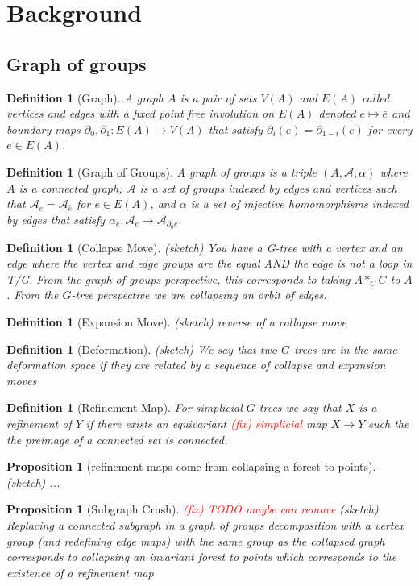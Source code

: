 \documentclass{article}
\newcommand{\fix}[1]{\textcolor{red}{(fix) #1}}
\theoremstyle{mystyle}
\newtheorem{pro}[thm]{Proposition}
\newtheorem{defn}[thm]{Definition}
\theoremstyle{remark}
\begin{document}
\tableofcontents

\section{Background}
\subsection{Graph of groups}
\begin{defn}
    [Graph]
    A graph $A$ is a pair of sets $V(A)$ and $E(A)$ called vertices and edges with a fixed point free involution on $E(A)$ denoted $e\mapsto \bar{e}$ and boundary maps $\partial_0,\partial_1: E(A)\to V(A)$ that satisfy $\partial_{i}(\bar{e})=\partial_{1-i}(e)$ for every $e \in E(A)$.
\end{defn}
\begin{defn}
    [Graph of Groups]
    A graph of groups is a triple $(A,\mathscr A, \alpha)$ where $A$ is a connected graph, $\mathscr A$ is a set of groups indexed by edges and vertices such that $\mathscr A_e=\mathscr A_{\bar e}$ for $e\in E(A)$, and $\alpha$ is a set of injective homomorphisms indexed by edges that satisfy $\alpha_e: \mathscr A_e\to \mathscr A_{\partial_0 e}$.
\end{defn}
\begin{defn}
    [Collapse Move]
    (sketch) You have a G-tree with a vertex and an edge where the vertex and edge groups are the equal AND the edge is not a loop in T/G. From the graph of groups perspective, this corresponds to taking $A*_C C$ to $A$. From the $G$-tree perspective we are collapsing an orbit of edges.
\end{defn}
\begin{defn}
    [Expansion Move]
    (sketch) reverse of a collapse move
\end{defn}
\begin{defn}
    [Deformation]
    \label{defn:deformation}
    (sketch)
    We say that two $G$-trees are in the same deformation space if they are related by a sequence of collapse and expansion moves
\end{defn}



\begin{defn}
    [Refinement Map]
    For simplicial $G$-trees we say that $X$ is a refinement of $Y$ if there exists an  equivariant \fix{simplicial} map $X\to Y$ such the the preimage of a connected set is connected.
\end{defn}
\begin{pro}
    [refinement maps come from collapsing a forest to points]
    (sketch)
    ...
\end{pro}
\begin{pro}
    [Subgraph Crush]
    \fix{TODO maybe can remove}
    (sketch)
    Replacing a connected subgraph in a graph of groups decomposition with a vertex group (and redefining edge maps) with the same group as the collapsed graph corresponds to collapsing an invariant forest to points which corresponds to the existence of a refinement map
\end{pro}
\end{document}
